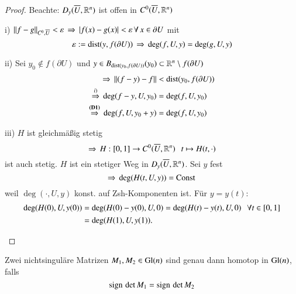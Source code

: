 \begin{proof}
    Beachte: $D_y(\overline U, \mathbb{R}^n)$ ist offen in $C^0(\overline U, \mathbb{R}^n)$
    \begin{description}
    \item{i)}
        $\|f-g\|_{C^0,\overline U} <\varepsilon \, \Rightarrow \, |f(x)-g(x)|<\varepsilon \, \forall \, x\in\partial U$ mit
        \[
            \varepsilon:= \mathrm{dist}(y,f(\partial U)) \, \Rightarrow \, \deg (f,U,y)=\deg (g,U,y)
        \]
    \item{ii)}
        Sei $y_0\nin f(\partial U)$ und $y\in B_{\mathrm{dist}(y_0,f(\partial U))}(y_0)\subset \mathbb{R}^n\setminus
                f(\partial U)$
        \begin{align*}
            \Rightarrow \, \|(f-y)-f\|&<\mathrm{dist}(y_0,f(\partial U))\\
                \overset{i)}{\Rightarrow} \, \deg(f-y,U,y_0) &= \deg(f,U,y_0)\\
            \overset{\textbf{(D1)}}{\Rightarrow } \, \deg (f,U,y_0+y)&= \deg(f,U,y_0)
        \end{align*}
    \item{iii)}
        $H$ ist gleichmäßig stetig
        \[
            \Rightarrow \, H:[0,1]\rightarrow C^0(\overline U,\mathbb{R}^n)\hspace{.25cm} t\mapsto H(t,\cdot)
        \]
        ist auch stetig. $H$ ist ein stetiger Weg in $D_y(\overline U,\mathbb{R}^n)$. Sei $y$ fest
        \[
            \Rightarrow \, \deg(H(t,U,y))=\mathrm{Const} \,
        \]
        weil $\deg(\cdot,U,y)$ konst. auf Zsh-Komponenten ist. Für $y=y(t):$
        \begin{align*}
            \deg(H(0),U,y(0))&=\deg(H(0)-y(0),U,0)=\deg(H(t)-y(t), U, 0) \hspace{.25cm} \forall t\in [0,1]\\
            &= \deg(H(1),U,y(1)).
        \end{align*}
    \end{description}
    \[ \]
\end{proof}

\begin{lem}\label{1.3.5}
    Zwei nichtsinguläre Matrizen $M_1,M_2\in \mathrm{Gl}(n)$ sind genau dann homotop in $\mathrm{Gl}(n)$, falls
    \[
        \mathrm{sign}\, \det M_1 = \mathrm{sign}\,\det M_2
    \]
\end{lem}

